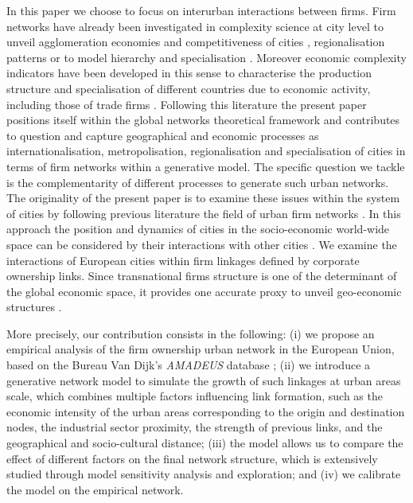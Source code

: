 \documentclass[10pt,letterpaper]{article}
\begin{document}
In this paper we choose to focus on interurban interactions between firms. Firm networks have already been investigated in complexity science at city level to unveil agglomeration economies and competitiveness of cities \cite{Rozenblat2010}, regionalisation patterns \cite{Rozenblatetal2017} or to model hierarchy and specialisation \cite{BidaRozenblat2020} \cite{BidaRozenblat2020}. Moreover economic complexity indicators have been developed in this sense to characterise the production structure and specialisation of different countries due to economic activity, including those of trade firms \cite{HaussmanHidalgo2009} \cite{OCleary2016}. Following this literature the present paper positions itself within the global networks theoretical framework and contributes to question and capture geographical and economic processes as internationalisation, metropolisation, regionalisation and specialisation of cities in terms of firm networks within a generative model. The specific question we tackle is the complementarity of different processes to generate such urban networks. The originality of the present paper is to examine these issues within the system of cities \cite{berry1964cities} by following previous literature the field of urban firm networks \cite{Rozenblatetal2017} . In this approach the position and dynamics of cities in the socio-economic world-wide space can be considered by their interactions with other cities \cite{pumain2018evolutionary}. We examine the interactions of European cities within firm linkages defined by corporate ownership links. Since transnational firms structure is one of the determinant of the global economic space, it provides one accurate proxy to unveil geo-economic structures \cite{2020Zdanowska}. 

More precisely, our contribution consists in the following: (i) we propose an empirical analysis of the firm ownership urban network in the European Union, based on the Bureau Van Dijk's \emph {AMADEUS} database \cite{AMADEUS2018}; (ii) we introduce a generative network model to simulate the growth of such linkages at urban areas scale, which combines multiple factors influencing link formation, such as the economic intensity of the urban areas corresponding to the origin and destination nodes, the industrial sector proximity, the strength of previous links, and the geographical and socio-cultural distance; (iii) the model allows us to compare the effect of different factors on the final network structure, which is extensively studied through model sensitivity analysis and exploration; and (iv) we calibrate the model on the empirical network.
\end{document}

